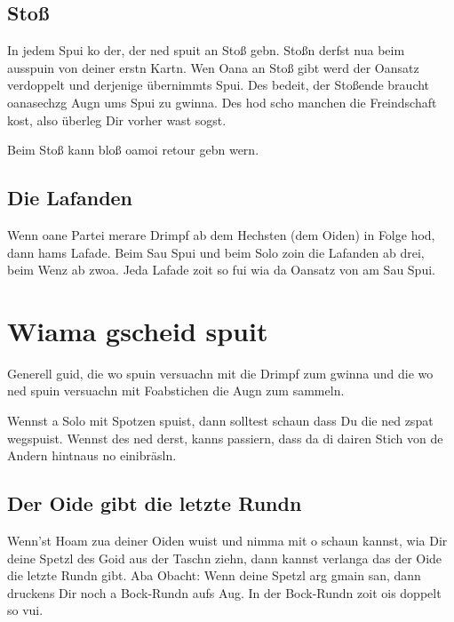 \documentclass[11pt,a4paper]{scrartcl}		%
\begin{document}
		\subsection{Stoß}
		In jedem Spui ko der, der ned spuit an Stoß gebn. Stoßn derfst nua beim ausspuin von deiner erstn Kartn.
		Wen Oana an Stoß gibt werd der Oansatz verdoppelt und derjenige übernimmts Spui.
		Des bedeit, der Stoßende braucht oanasechzg Augn ums Spui zu gwinna. Des hod scho manchen die Freindschaft kost, also überleg Dir vorher wast sogst.

		Beim Stoß kann bloß oamoi retour gebn wern.


		\subsection{Die Lafanden}
		Wenn oane Partei merare Drimpf ab dem Hechsten (dem Oiden) in Folge hod, dann hams Lafade.
		Beim Sau Spui und beim Solo zoin die Lafanden ab drei, beim Wenz ab zwoa.
		Jeda Lafade zoit so fui wia da Oansatz von am Sau Spui. 




	\section{Wiama gscheid spuit}

	Generell guid, die wo spuin versuachn mit die Drimpf zum gwinna und die wo ned spuin versuachn mit Foabstichen die Augn zum sammeln. 



	Wennst a Solo mit Spotzen spuist, dann solltest schaun dass Du die ned zspat wegspuist. Wennst des ned derst, kanns passiern, dass da di dairen Stich von de Andern hintnaus no einibräsln.



\subsection{Der Oide gibt die letzte Rundn}
Wenn'st Hoam zua deiner Oiden wuist und nimma mit o schaun kannst, wia Dir deine Spetzl des Goid aus der Taschn ziehn, dann kannst verlanga das der Oide die letzte Rundn gibt. Aba Obacht: Wenn deine Spetzl arg gmain san, dann druckens Dir noch a Bock-Rundn aufs Aug. In der Bock-Rundn zoit ois doppelt so vui.
\end{document}
